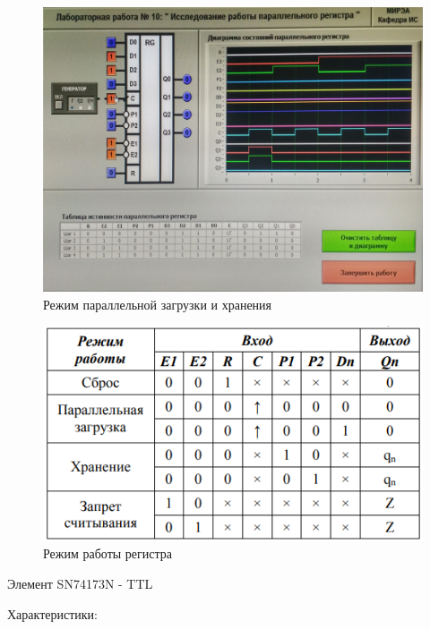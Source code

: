 \begin{figure}[H]
	\centering
	\includegraphics[width=0.95\linewidth]{imgs/10/2.jpg}
	\caption{Режим параллельной загрузки и хранения}
	\label{fig:10_2}
\end{figure}



\begin{figure}[H]
	\centering
	\includegraphics[width=0.95\linewidth]{imgs/10/10_tab}
	\caption{Режим работы регистра}
	\label{fig:10_tab}
\end{figure}

Элемент SN74173N - TTL

Характеристики:

